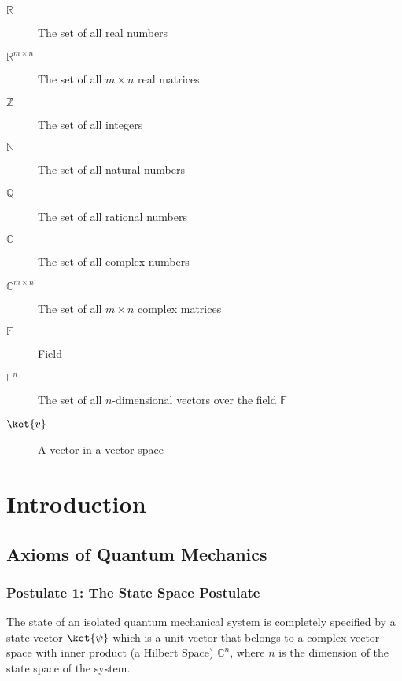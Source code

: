 \documentclass[12pt, oneside]{book}
\theoremstyle{definition}
\theoremstyle{definition}
\theoremstyle{remark}
\begin{document}
\begin{description}
    \item[$\mathbb{R}$] The set of all real numbers
    \item[$\mathbb{R}^{m \times n} $] The set of all $m \times n$ real matrices
    \item[$\mathbb{Z}$] The set of all integers
    \item[$\mathbb{N}$] The set of all natural numbers
    \item[$\mathbb{Q}$] The set of all rational numbers
    \item[$\mathbb{C}$] The set of all complex numbers
    \item[$\mathbb{C}^{m \times n}$] The set of all $m \times n$ complex matrices
    \item[$\mathbb{F}$] Field
    \item[$\mathbb{F}^{n}$] The set of all $n$-dimensional vectors over the field $\mathbb{F}$
    \item[$\ket{v}$] A vector in a vector space
\end{description}


\mainmatter  %

\chapter{Introduction}
\section{Axioms of Quantum Mechanics}
\subsection{Postulate 1: The State Space Postulate}
The state of an isolated quantum mechanical system is completely specified by a state vector $\ket{\psi}$ 
which is a unit vector that belongs to a complex vector space with inner product (a Hilbert Space) $\mathbb{C}^{n}$, where $n$ is the 
dimension of the state space of the system. 
\end{document}

